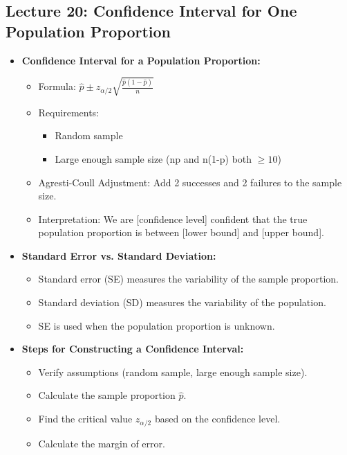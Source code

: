 \documentclass{article}
\begin{document}
\begin{multicols}{2}\section*{Lecture 20: Confidence Interval for One Population Proportion}

\begin{itemize}
\item \textbf{Confidence Interval for a Population Proportion:}
    \begin{itemize}
        \item Formula: $\hat{p} \pm z_{\alpha/2} \sqrt{\frac{\hat{p}(1-\hat{p})}{n}}$
        \item Requirements:
            \begin{itemize}
                \item Random sample
                \item Large enough sample size (np and n(1-p) both $\ge 10$)
            \end{itemize}
        \item Agresti-Coull Adjustment: Add 2 successes and 2 failures to the sample size.
        \item Interpretation: We are [confidence level] confident that the true population proportion is between [lower bound] and [upper bound].
    \end{itemize}
\item \textbf{Standard Error vs. Standard Deviation:}
    \begin{itemize}
        \item Standard error (SE) measures the variability of the sample proportion.
        \item Standard deviation (SD) measures the variability of the population.
        \item SE is used when the population proportion is unknown.
    \end{itemize}
\item \textbf{Steps for Constructing a Confidence Interval:}
    \begin{itemize}
        \item Verify assumptions (random sample, large enough sample size).
        \item Calculate the sample proportion $\hat{p}$.
        \item Find the critical value $z_{\alpha/2}$ based on the confidence level.
        \item Calculate the margin of error.

\end{itemize}
\end{itemize}
\end{multicols}
\end{document}

